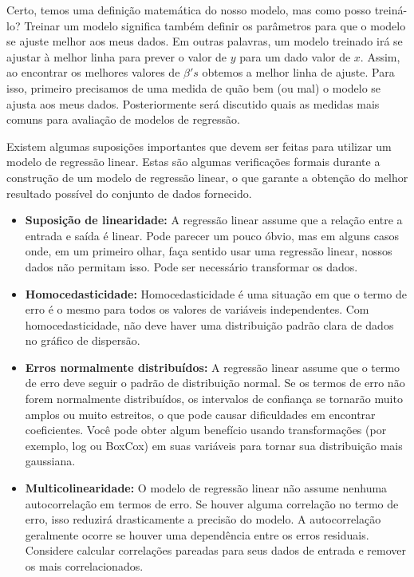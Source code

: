 \documentclass[
  letterpaper,
  DIV=11,
  numbers=noendperiod]{scrreprt}
\begin{document}
Certo, temos uma definição matemática do nosso modelo, mas como posso
treiná-lo? Treinar um modelo significa também definir os parâmetros para
que o modelo se ajuste melhor aos meus dados. Em outras palavras, um
modelo treinado irá se ajustar à melhor linha para prever o valor de
\(y\) para um dado valor de \(x\). Assim, ao encontrar os melhores
valores de \(\beta 's\) obtemos a melhor linha de ajuste. Para isso,
primeiro precisamos de uma medida de quão bem (ou mal) o modelo se
ajusta aos meus dados. Posteriormente será discutido quais as medidas
mais comuns para avaliação de modelos de regressão.

Existem algumas suposições importantes que devem ser feitas para
utilizar um modelo de regressão linear. Estas são algumas verificações
formais durante a construção de um modelo de regressão linear, o que
garante a obtenção do melhor resultado possível do conjunto de dados
fornecido.

\begin{itemize}
\item
  \textbf{Suposição de linearidade:} A regressão linear assume que a
  relação entre a entrada e saída é linear. Pode parecer um pouco óbvio,
  mas em alguns casos onde, em um primeiro olhar, faça sentido usar uma
  regressão linear, nossos dados não permitam isso. Pode ser necessário
  transformar os dados.
\item
  \textbf{Homocedasticidade:} Homocedasticidade é uma situação em que o
  termo de erro é o mesmo para todos os valores de variáveis
  \hspace{0pt}\hspace{0pt}independentes. Com homocedasticidade, não deve
  haver uma distribuição padrão clara de dados no gráfico de dispersão.
\item
  \textbf{Erros normalmente distribuídos:} A regressão linear assume que
  o termo de erro deve seguir o padrão de distribuição normal. Se os
  termos de erro não forem normalmente distribuídos, os intervalos de
  confiança se tornarão muito amplos ou muito estreitos, o que pode
  causar dificuldades em encontrar coeficientes. Você pode obter algum
  benefício usando transformações (por exemplo, log ou BoxCox) em suas
  variáveis \hspace{0pt}\hspace{0pt}para tornar sua distribuição mais
  gaussiana.
\item
  \textbf{Multicolinearidade:} O modelo de regressão linear não assume
  nenhuma autocorrelação em termos de erro. Se houver alguma correlação
  no termo de erro, isso reduzirá drasticamente a precisão do modelo. A
  autocorrelação geralmente ocorre se houver uma dependência entre os
  erros residuais. Considere calcular correlações pareadas para seus
  dados de entrada e remover os mais correlacionados.
\end{itemize}
\end{document}
